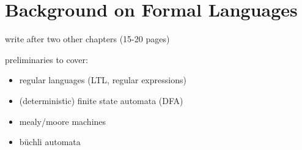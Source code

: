 \section{Background on Formal Languages}

\begin{notes}
    write after two other chapters (15-20 pages)

    preliminaries to cover:

    \begin{itemize}
        \item regular languages (LTL, regular expressions)
        \item (deterministic) finite state automata (DFA)
        \item mealy/moore machines
        \item büchli automata
    \end{itemize}
\end{notes}
